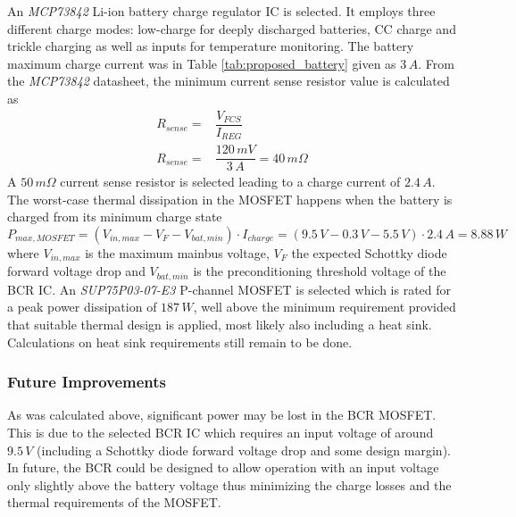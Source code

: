 An \textit{MCP73842} Li-ion battery charge regulator \ac{IC} is selected. It employs three different charge modes: low-charge for deeply discharged batteries, \ac{CC} charge and trickle charging as well as inputs for temperature monitoring. The battery maximum charge current was in Table \ref{tab:proposed_battery} given as $3\,A$. From the \textit{MCP73842} datasheet, the minimum current sense resistor value is calculated as
%
\begin{equation}
\begin{split}
R_{sense}=&\dfrac{V_{FCS}}{I_{REG}}\\
R_{sense}=&\dfrac{120\,mV}{3\,A}=40\,m\Omega
\end{split}
\end{equation}
%
A $50\,m \Omega$ current sense resistor is selected leading to a charge current of $2.4\,A$.
%
The worst-case thermal dissipation in the MOSFET happens when the battery is charged from its minimum charge state
%
\begin{equation}
P_{max,MOSFET}=(V_{in,max}-V_F-V_{bat,min})\cdot I_{charge}=(9.5\,V-0.3\,V-5.5\,V)\cdot 2.4\,A=8.88\,W
\end{equation}
%
where $V_{in,max}$ is the maximum mainbus voltage, $V_F$ the expected Schottky diode forward voltage drop and $V_{bat,min}$ is the preconditioning threshold voltage of the \ac{BCR} \ac{IC}.
An \textit{SUP75P03-07-E3} P-channel MOSFET is selected which is rated for a peak power dissipation of $187\,W$, well above the minimum requirement provided that suitable thermal design is applied, most likely also including a heat sink. 
\\[2mm]
Calculations on heat sink requirements still remain to be done.
%
\subsubsection*{Future Improvements}
As was calculated above, significant power may be lost in the \ac{BCR} MOSFET. This is due to the selected \ac{BCR} \ac{IC} which requires an input voltage of around $9.5\,V$ (including a Schottky diode forward voltage drop and some design margin). In future, the \ac{BCR} could be designed to allow operation with an input voltage only slightly above the battery voltage thus minimizing the charge losses and the thermal requirements of the MOSFET.
%
%
